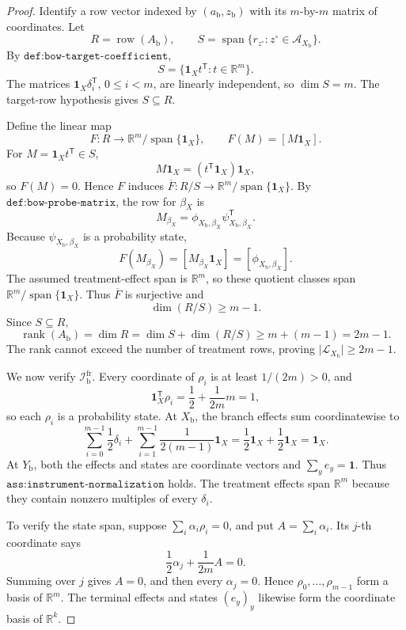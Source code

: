 \documentclass{article}
\begin{document}
\begin{proof}
Identify a row vector indexed by \((a_{\mathrm b},z_{\mathrm b})\) with its \(m\)-by-\(m\) matrix of coordinates.  Let
\[
R=\operatorname{row}(A_{\mathrm b}),
\qquad
S=\operatorname{span}\{r_{z^{\circ}}:z^{\circ}\in\mathcal A_{X_{\mathrm b}}\}.
\]
By \(\texttt{def:bow-target-coefficient}\),
\[
S=\{\mathbf 1_Xt^{\mathsf T}:t\in\mathbb R^m\}.
\]
The matrices \(\mathbf 1_X\delta_i^{\mathsf T}\), \(0\leq i<m\), are linearly independent, so \(\dim S=m\).  The target-row hypothesis gives \(S\subseteq R\).

Define the linear map
\[
F:R\longrightarrow\mathbb R^m/\operatorname{span}\{\mathbf 1_X\},
\qquad
F(M)=[M\mathbf 1_X].
\]
For \(M=\mathbf 1_Xt^{\mathsf T}\in S\),
\[
M\mathbf 1_X=(t^{\mathsf T}\mathbf 1_X)\mathbf 1_X,
\]
so \(F(M)=0\).  Hence \(F\) induces \(\overline F:R/S\to\mathbb R^m/\operatorname{span}\{\mathbf 1_X\}\).  By \(\texttt{def:bow-probe-matrix}\), the row for \(\beta_X\) is
\[
M_{\beta_X}=\phi_{X_{\mathrm b},\beta_X}\psi_{X_{\mathrm b},\beta_X}^{\mathsf T}.
\]
Because \(\psi_{X_{\mathrm b},\beta_X}\) is a probability state,
\[
F(M_{\beta_X})=[M_{\beta_X}\mathbf 1_X]=[\phi_{X_{\mathrm b},\beta_X}].
\]
The assumed treatment-effect span is \(\mathbb R^m\), so these quotient classes span \(\mathbb R^m/\operatorname{span}\{\mathbf 1_X\}\).  Thus \(\overline F\) is surjective and
\[
\dim(R/S)\geq m-1.
\]
Since \(S\subseteq R\),
\[
\operatorname{rank}(A_{\mathrm b})=\dim R
=\dim S+\dim(R/S)
\geq m+(m-1)=2m-1.
\]
The rank cannot exceed the number of treatment rows, proving \(\lvert\mathcal L_{X_{\mathrm b}}\rvert\geq2m-1\).

We now verify \(\mathcal I_{\mathrm b}^{\mathrm{fr}}\).  Every coordinate of \(\rho_i\) is at least \(1/(2m)>0\), and
\[
\mathbf 1_X^{\mathsf T}\rho_i=\frac12+\frac1{2m}m=1,
\]
so each \(\rho_i\) is a probability state.  At \(X_{\mathrm b}\), the branch effects sum coordinatewise to
\[
\sum_{i=0}^{m-1}\frac12\delta_i
+\sum_{i=1}^{m-1}\frac1{2(m-1)}\mathbf 1_X
=\frac12\mathbf 1_X+\frac12\mathbf 1_X
=\mathbf 1_X.
\]
At \(Y_{\mathrm b}\), both the effects and states are coordinate vectors and \(\sum_y e_y=\mathbf 1\).  Thus \(\texttt{ass:instrument-normalization}\) holds.  The treatment effects span \(\mathbb R^m\) because they contain nonzero multiples of every \(\delta_i\).

To verify the state span, suppose \(\sum_i\alpha_i\rho_i=0\), and put \(A=\sum_i\alpha_i\).  Its \(j\)-th coordinate says
\[
\frac12\alpha_j+\frac1{2m}A=0.
\]
Summing over \(j\) gives \(A=0\), and then every \(\alpha_j=0\).  Hence \(\rho_0,\ldots,\rho_{m-1}\) form a basis of \(\mathbb R^m\).  The terminal effects and states \((e_y)_y\) likewise form the coordinate basis of \(\mathbb R^k\).


\end{proof}
\end{document}
